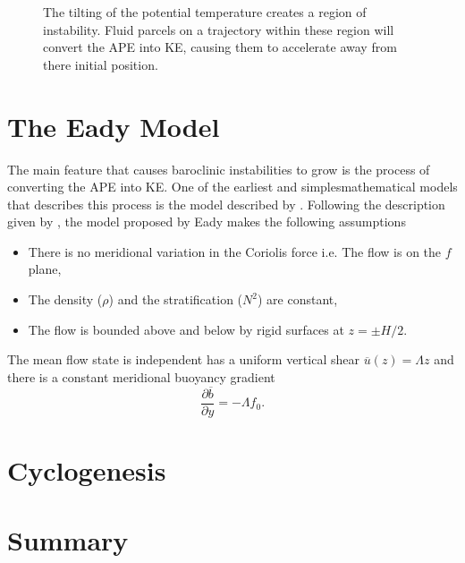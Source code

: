 \documentclass{article}
\begin{document}
\begin{figure}[hb]
  \centering
  
  \caption{The tilting of the potential temperature creates a region of instability. Fluid parcels on a trajectory within these region will convert the APE into KE, causing them to accelerate away from there initial position. }
  \label{pedloskyexample}
\end{figure}

\section{The Eady Model}
The main feature that causes baroclinic instabilities to grow is the process of converting the APE into KE. One of the earliest and simplesmathematical models that describes this process is the model described by \cite{Eady1949}. Following the description given by \cite{Hoskins2013}, the model proposed by Eady makes the following assumptions
\begin{itemize}
  \item There is no meridional variation in the Coriolis force i.e. The flow is on the $f$ plane,
  \item The density ($\rho$) and the stratification ($N^2$) are constant,
  \item The flow is bounded above and below by rigid surfaces at $z=\pm H/2$. 
\end{itemize}
The mean flow state is independent has a uniform vertical shear $\overline{u}(z) = \Lambda z$ and there is a constant meridional buoyancy gradient 
$$\frac{\partial\overline{b}}{\partial y} = -\Lambda f_0.$$
\begin{figure}[hb]
  \centering
  
  \caption{ }
  \label{eadyexample}
\end{figure}
\section{Cyclogenesis} 

\section{Summary}


\end{document}
